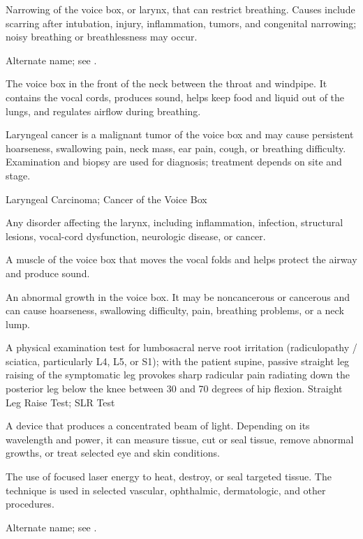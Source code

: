  Narrowing of the voice box, or larynx, that can restrict breathing. Causes include scarring after intubation, injury, inflammation, tumors, and congenital narrowing; noisy breathing or breathlessness may occur.

 Alternate name; see .

 The voice box in the front of the neck between the throat and windpipe. It contains the vocal cords, produces sound, helps keep food and liquid out of the lungs, and regulates airflow during breathing.

 Laryngeal cancer is a malignant tumor of the voice box and may cause persistent hoarseness, swallowing pain, neck mass, ear pain, cough, or breathing difficulty. Examination and biopsy are used for diagnosis; treatment depends on site and stage.

\synonyms
Laryngeal Carcinoma; Cancer of the Voice Box

 Any disorder affecting the larynx, including inflammation, infection, structural lesions, vocal-cord dysfunction, neurologic disease, or cancer.

 A muscle of the voice box that moves the vocal folds and helps protect the airway and produce sound.

 An abnormal growth in the voice box. It may be noncancerous or cancerous and can cause hoarseness, swallowing difficulty, pain, breathing problems, or a neck lump.

 A physical examination test for lumbosacral nerve root irritation (radiculopathy / sciatica, particularly L4, L5, or S1); with the patient supine, passive straight leg raising of the symptomatic leg provokes sharp radicular pain radiating down the posterior leg below the knee between 30 and 70 degrees of hip flexion.
\synonyms
Straight Leg Raise Test; SLR Test

 A device that produces a concentrated beam of light. Depending on its wavelength and power, it can measure tissue, cut or seal tissue, remove abnormal growths, or treat selected eye and skin conditions.

 The use of focused laser energy to heat, destroy, or seal targeted tissue. The technique is used in selected vascular, ophthalmic, dermatologic, and other procedures.

 Alternate name; see .

